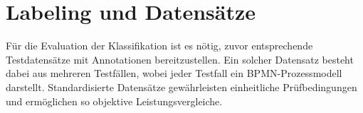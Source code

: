 \chapter{Labeling und Datensätze}\label{ch:labeling-und-datensatze}

Für die Evaluation der Klassifikation ist es nötig, zuvor entsprechende Testdatensätze mit Annotationen bereitzustellen. Ein solcher Datensatz besteht dabei aus mehreren Testfällen, wobei jeder Testfall ein \ac{BPMN}-Prozessmodell darstellt. Standardisierte Datensätze gewährleisten einheitliche Prüfbedingungen und ermöglichen so objektive Leistungsvergleiche.



